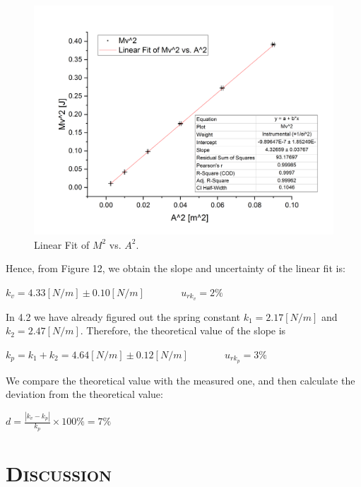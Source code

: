 \documentclass[a4paper,12pt]{article}
\begin{document}
\begin{figure}[p] 
    \centering
    \includegraphics[width=1\textwidth]{pic8} 
    \caption{Linear Fit of $M^2$ vs. $A^2$.} 
\end{figure}

\par Hence, from Figure 12, we obtain the slope and uncertainty of the linear fit is:
\begin{center}
$ k_v = 4.33 [N/m] \pm 0.10 [N/m] $ ~~~~~~ $ u_{rk_v} = 2\% $
\end{center}

In 4.2 we have already figured out the spring constant $k_1 = 2.17 [N/m] $ and $k_2 = 2.47[N/m]$. Therefore, the theoretical value of the slope is 
\begin{center}
$k_p = k_1 + k_2 = 4.64 [N/m] \pm 0.12 [N/m] $ ~~~~~~ $ u_{rk_p} = 3\% $
\end{center}

\par We compare the theoretical value with the measured one, and then calculate the deviation from the theoretical value:
\begin{center}
$\displaystyle d = \frac{|k_v - k_p|}{k_p} \times 100\% = 7\% $
\end{center}

\newpage
\section{\textsc{Discussion}}
\end{document}
